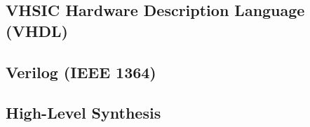 \subsection{VHSIC Hardware Description Language (VHDL)}

\subsection{Verilog (IEEE 1364)}

\subsection{High-Level Synthesis}
